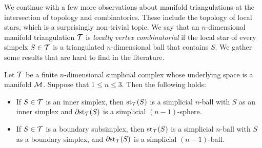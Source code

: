 \documentclass[10pt,letterpaper]{article}
\begin{document}
We continue with a few more observations about manifold triangulations
at the intersection of topology and combinatorics. 
These include the topology of local stars, which is a surprisingly non-trivial topic. 
We say that an $n$-dimensional manifold triangulation ${\mathcal T}$ is \emph{locally vertex combinatorial}
if the local star of every simpelx $S \in {\mathcal T}$ is a triangulated $n$-dimensional ball that contains $S$.
We gather some results that are hard to find in the literature. 

\begin{lemma}\label{lemma:startopology}
    Let ${\mathcal T}$ be a finite $n$-dimensional simplicial complex whose underlying space is a manifold ${\mathcal M}$.
    Suppose that $1 \leq n \leq 3$. Then the following holds:
    \begin{itemize}
        \item
        If $S \in {\mathcal T}$ is an inner simplex, 
        then $\operatorname{st}_{{\mathcal T}}(S)$ is a simplicial $n$-ball with $S$ as an inner simplex
        and ${\partial \rm st}_{{\mathcal T}}(S)$ is a simplicial $(n-1)$-sphere. 
        \item
        If $S \in {\mathcal T}$ is a boundary subsimplex, 
        then $\operatorname{st}_{{\mathcal T}}(S)$ is a simplicial $n$-ball with $S$ as a boundary simplex,
        and ${\partial \rm st}_{{\mathcal T}}(S)$ is a simplicial $(n-1)$-ball.
    \end{itemize}
\end{lemma}
\end{document}
